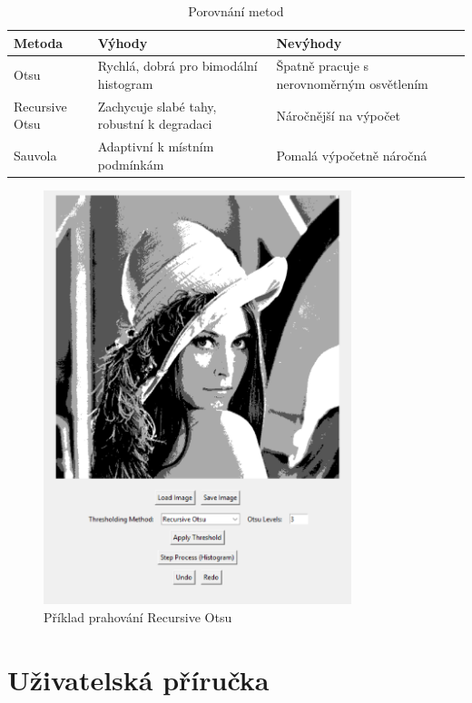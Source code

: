 \documentclass[12pt,a4paper]{article}
\begin{document}
\begin{table}[h]
\centering
\caption{Porovnání metod}
\begin{tabular}{|l|l|l|}
\hline
Metoda & Výhody & Nevýhody \\
\hline
Otsu & Rychlá, dobrá pro bimodální histogram & Špatně pracuje s nerovnoměrným osvětlením \\
Recursive Otsu & Zachycuje slabé tahy, robustní k degradaci & Náročnější na výpočet \\
Sauvola & Adaptivní k místním podmínkám & Pomalá výpočetně náročná \\
\hline
\end{tabular}
\end{table}
\newpage
\begin{figure}[h]
\centering
\includegraphics[width=0.8\textwidth]{otsu.png}
\caption{Příklad prahování Recursive Otsu}
\label{fig:vysledky}
\end{figure}


\section{Uživatelská příručka}
\end{document}
